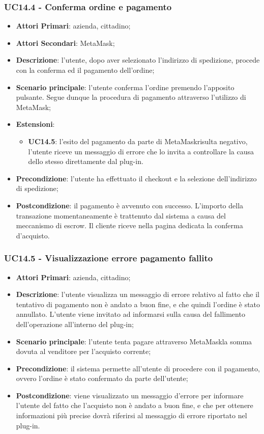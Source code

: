 \subsubsection{UC14.4 - Conferma ordine e pagamento}
\begin{itemize}
	\item \textbf{Attori Primari}: azienda, cittadino;
	\item \textbf{Attori Secondari}: MetaMask\glo;
	\item \textbf{Descrizione}: l'utente, dopo aver selezionato l'indirizzo di spedizione, procede con la conferma ed il pagamento dell'ordine;
	\item \textbf{Scenario principale}: l'utente conferma l'ordine premendo l'apposito pulsante. Segue dunque la procedura di pagamento attraverso l'utilizzo di MetaMask\glo;
	\item \textbf{Estensioni}: 
	\begin{itemize}
		\item \textbf{UC14.5}: l'esito del pagamento da parte di MetaMask\glosp risulta negativo, l'utente riceve un messaggio di errore che lo invita a controllare la causa dello stesso direttamente dal plug-in\glo. 
	\end{itemize}
	\item \textbf{Precondizione}: l'utente ha effettuato il checkout e la selezione dell'indirizzo di spedizione;
	\item \textbf{Postcondizione}: il pagamento è avvenuto con successo. 
	L'importo della transazione momentaneamente è trattenuto dal sistema a 
	causa del meccanismo di escrow\glo. Il cliente riceve nella pagina dedicata 
	la conferma d'acquisto\glo.
\end{itemize}


\subsubsection{UC14.5 - Visualizzazione errore pagamento fallito}
\begin{itemize}
	\item \textbf{Attori Primari}: azienda, cittadino;
	\item \textbf{Descrizione}:
	l'utente visualizza un messaggio di errore relativo al fatto che il tentativo di pagamento non è andato a buon fine, e che quindi l'ordine è stato annullato. L'utente viene invitato ad informarsi sulla causa del fallimento dell'operazione all'interno del plug-in;
	\item \textbf{Scenario principale}: l'utente tenta pagare attraverso MetaMask\glosp la somma dovuta al venditore per l'acquisto corrente;
	\item \textbf{Precondizione}: il sistema permette all'utente di procedere con il pagamento, ovvero l'ordine è stato confermato da parte dell'utente;
	\item \textbf{Postcondizione}: viene visualizzato un messaggio d'errore per informare l'utente del fatto che l'acquisto non è andato a buon fine, e che per ottenere informazioni più precise dovrà riferirsi al messaggio di errore riportato nel plug-in. 
\end{itemize} 






